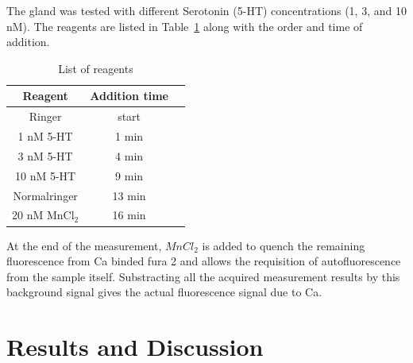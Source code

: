 The gland was tested with different Serotonin (5-HT) concentrations (1, 3, and 10 nM). 
The reagents are listed in Table~\ref{tab:seroca} along with the order and time of addition.

\begin{table}[hbt]
\caption{List of reagents}
\centering
\begin{tabular}{ccc}
\toprule
Reagent & Addition time \\
\midrule
Ringer				&start\\
1 nM 5-HT			&1 min\\
3 nM 5-HT 			&4 min\\
10 nM 5-HT 		&9 min\\
Normalringer 		&13 min\\
20 nM MnCl$_2$ 	&16 min\\
\bottomrule
\end{tabular}
\label{tab:seroca}
\end{table}

At the end of the measurement, $MnCl_2$ is added to quench the remaining fluorescence from Ca binded fura 2 and allows the requisition of autofluorescence from the sample itself. 
Substracting all the acquired measurement results by this background signal gives the actual fluorescence signal due to Ca.

\section{Results and Discussion}

